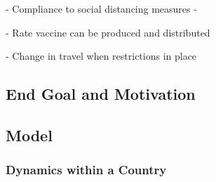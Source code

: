 \documentclass[a4paper,11pt]{article}
\theoremstyle{plain}
\theoremstyle{definition}
\begin{document}
- Compliance to social distancing measures - 

- Rate vaccine can be produced and distributed

- Change in travel when restrictions in place

\subsection{End Goal and Motivation}

\break

\subsection{Model}

\subsubsection{Dynamics within a Country}
\end{document}
